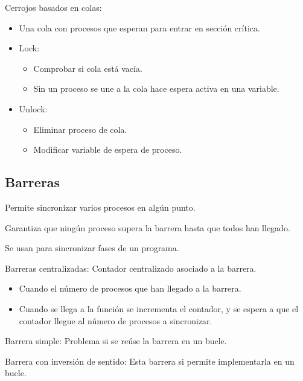\documentclass[12pt, twoside, openright]{report} %
\begin{document}
Cerrojos basados en colas:

\begin{itemize}

	\item Una cola con procesos que esperan para entrar en sección
	      crítica.
	\item Lock:

	      \begin{itemize}

		      \item Comprobar si cola está vacía.
		      \item Sin un proceso se une a la cola hace espera activa en una
		            variable.
	      \end{itemize}
	\item Unlock:

	      \begin{itemize}

		      \item Eliminar proceso de cola.
		      \item Modificar variable de espera de proceso.
	      \end{itemize}
\end{itemize}

\subsection{Barreras}

Permite sincronizar varios procesos en algún punto.


Garantiza que ningún proceso supera la barrera hasta que todos han
llegado.

Se usan para sincronizar fases de un programa.
\pagebreak

Barreras centralizadas: Contador centralizado asociado a la
barrera.

\begin{itemize}

	\item Cuando el número de procesos que han llegado a la barrera.
	\item Cuando se llega a la función se incrementa el contador, y se
	      espera a que el contador llegue al número de procesos a
	      sincronizar.
\end{itemize}

Barrera simple: Problema si se reúse la barrera en un bucle.

Barrera con inversión de sentido: Esta barrera si permite
implementarla en un bucle.
\end{document}

